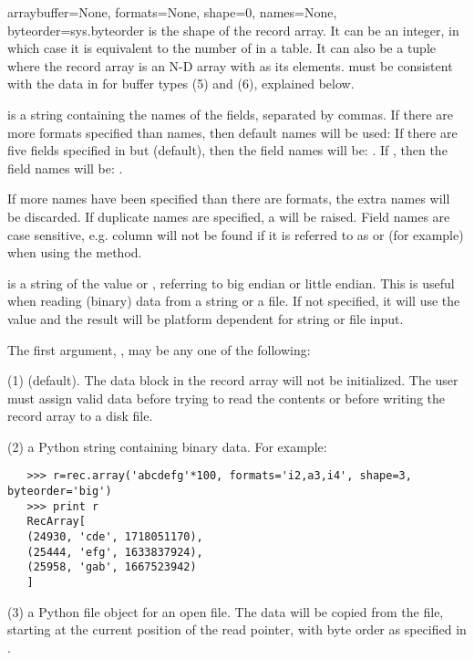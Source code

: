 \begin{funcdesc}{array}{buffer=None, formats=None, shape=0, 
names=None, byteorder=sys.byteorder}
    is the shape of the record array.  It can be an integer, 
   in which case it is equivalent to the number of  in a table.  
   It can also be a tuple where the record array is an N-D array with 
    as its elements.  must be consistent with the 
   data in  for buffer types (5) and (6), explained below.
   
    is a string containing the names of the fields, separated by 
   commas.  If there are more formats specified than names, then default 
   names will be used: If there are five fields specified in  
   but  (default), then the field names will be: 
   .  If , then the field 
   names will be: .
   
   If more names have been specified than there are formats, the extra names 
   will be discarded.  If duplicate names are specified, a  
   will be raised.  Field names are case sensitive, e.g. column  will 
   not be found if it is referred to as  or  
   (for example) when using the  method.
   
    is a string of the value  or , 
   referring to big endian or little endian.  This is useful when reading 
   (binary) data from a string or a file.  If not specified, it will use the 
    value and the result will be platform dependent for 
   string or file input.
   
   The first argument, , may be any one of the following:

   (1)  (default).  The data block in the record array will not be 
   initialized.  The user must assign valid data before trying to read the 
   contents or before writing the record array to a disk file.
   
   (2) a Python string containing binary data.  For example:
   \begin{verbatim}
   >>> r=rec.array('abcdefg'*100, formats='i2,a3,i4', shape=3, byteorder='big')
   >>> print r
   RecArray[ 
   (24930, 'cde', 1718051170),
   (25444, 'efg', 1633837924),
   (25958, 'gab', 1667523942)
   ]
   \end{verbatim}
   
   (3) a Python file object for an open file.  The data will be copied from 
   the file, starting at the current position of the read pointer, with 
   byte order as specified in .
   

\end{funcdesc}
